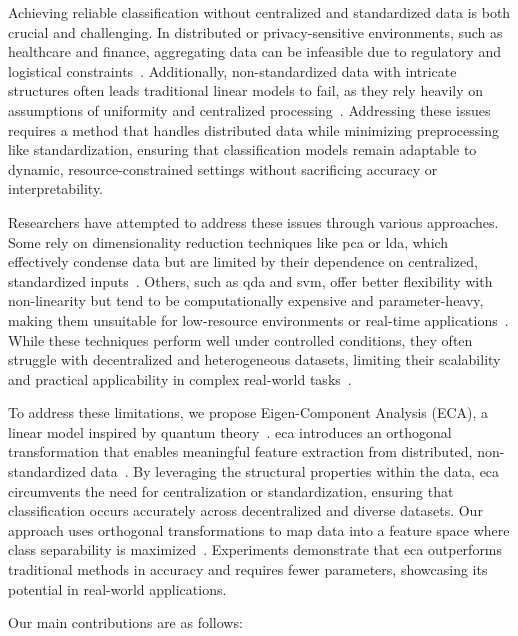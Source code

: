 \documentclass[conference]{IEEEtran}
\begin{document}
Achieving reliable classification without centralized and standardized data is both crucial and challenging. In distributed or privacy-sensitive environments, such as healthcare and finance, aggregating data can be infeasible due to regulatory and logistical constraints~\cite{kaissis2020secure,li2021survey}. Additionally, non-standardized data with intricate structures often leads traditional linear models to fail, as they rely heavily on assumptions of uniformity and centralized processing~\cite{singh2020investigating}. Addressing these issues requires a method that handles distributed data while minimizing preprocessing like standardization, ensuring that classification models remain adaptable to dynamic, resource-constrained settings without sacrificing accuracy or interpretability.

Researchers have attempted to address these issues through various approaches. Some rely on dimensionality reduction techniques like \Gls{pca} or \Gls{lda}, which effectively condense data but are limited by their dependence on centralized, standardized inputs~\cite{hastie2009elements}. Others, such as \Gls{qda} and \Gls{svm}, offer better flexibility with non-linearity but tend to be computationally expensive and parameter-heavy, making them unsuitable for low-resource environments or real-time applications~\cite{pavlov2000scaling}. While these techniques perform well under controlled conditions, they often struggle with decentralized and heterogeneous datasets, limiting their scalability and practical applicability in complex real-world tasks~\cite{li2021survey}.

To address these limitations, we propose Eigen-Component Analysis (ECA), a linear model inspired by quantum theory~\cite{tang2019quantum}. \Gls{eca} introduces an orthogonal transformation that enables meaningful feature extraction from distributed, non-standardized data~\cite{sanchez1996use,kanjilal1995application,yen1999simplifying}. By leveraging the structural properties within the data, \Gls{eca} circumvents the need for centralization or standardization, ensuring that classification occurs accurately across decentralized and diverse datasets. Our approach uses orthogonal transformations to map data into a feature space where class separability is maximized~\cite{sanchez1996use,kanjilal1995application}. Experiments demonstrate that \Gls{eca} outperforms traditional methods in accuracy and requires fewer parameters, showcasing its potential in real-world applications.


Our main contributions are as follows:
\end{document}
